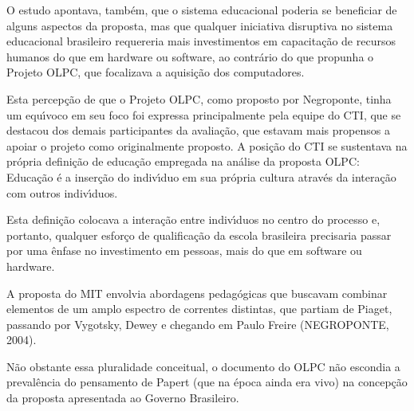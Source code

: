 \documentclass[
12pt,		%
openright,	%
twoside,  %
a4paper,			%
chapter=TITLE,		%
english,			%
french,				%
spanish,			%
brazil				%
]{USPSC-classe/USPSC}
\begin{document}
O estudo apontava, tamb\'em, que o sistema educacional poderia se beneficiar de alguns aspectos da proposta, mas que qualquer iniciativa disruptiva no sistema educacional brasileiro requereria mais investimentos em capacita\c{c}\~ao de recursos humanos do que em hardware ou software, ao contr\'ario do que propunha o Projeto OLPC, que focalizava a aquisi\c{c}\~ao dos computadores.









Esta percep\c{c}\~ao de que o Projeto OLPC, como proposto por Negroponte, tinha um equ\'{\i}voco em seu foco foi expressa principalmente pela equipe do CTI, que se destacou dos demais participantes da avalia\c{c}\~ao, que estavam mais propensos a apoiar o projeto como originalmente proposto. A posi\c{c}\~ao do CTI se sustentava na pr\'opria defini\c{c}\~ao de educa\c{c}\~ao empregada na an\'alise da proposta OLPC: \textquotedbl Educa\c{c}\~ao \'e a inser\c{c}\~ao do indiv\'{\i}duo em sua pr\'opria cultura atrav\'es da intera\c{c}\~ao com outros indiv\'{\i}duos\textquotedbl .









Esta defini\c{c}\~ao colocava a intera\c{c}\~ao entre indiv\'{\i}duos no centro do processo e, portanto, qualquer esfor\c{c}o de qualifica\c{c}\~ao da escola brasileira precisaria passar por uma \^enfase no investimento em \textquotedbl pessoas, mais do que em software ou hardware\textquotedbl .









A proposta do MIT envolvia abordagens pedag\'ogicas que buscavam combinar elementos de um amplo espectro de correntes distintas, que partiam de Piaget, passando por Vygotsky, Dewey e chegando em Paulo Freire  (NEGROPONTE, 2004).









N\~ao obstante essa pluralidade conceitual, o documento do OLPC n\~ao escondia a preval\^encia do pensamento de Papert (que na \'epoca ainda era vivo) na concep\c{c}\~ao da proposta apresentada ao Governo Brasileiro.
\end{document}
